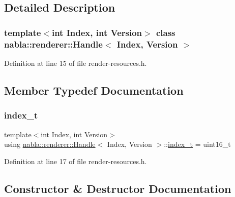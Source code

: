 \subsection{Detailed Description}
\subsubsection*{template$<$int Index, int Version$>$\newline
class nabla\+::renderer\+::\+Handle$<$ Index, Version $>$}



Definition at line 15 of file render-\/resources.\+h.



\subsection{Member Typedef Documentation}
\mbox{\label{classnabla_1_1renderer_1_1_handle_a84dca34f5b735ae64ed8ca821e376c59}} 
\subsubsection{\texorpdfstring{index\_t}{index\_t}}
{\footnotesize\ttfamily template$<$int Index, int Version$>$ \\
using \mbox{\hyperlink{classnabla_1_1renderer_1_1_handle}{nabla\+::renderer\+::\+Handle}}$<$ Index, Version $>$\+::\mbox{\hyperlink{classnabla_1_1renderer_1_1_handle_a84dca34f5b735ae64ed8ca821e376c59}{index\+\_\+t}} =  uint16\+\_\+t}



Definition at line 17 of file render-\/resources.\+h.



\subsection{Constructor \& Destructor Documentation}
\mbox{\label{classnabla_1_1renderer_1_1_handle_a1620bf65767fb875c18ba069d57bef81}} 
